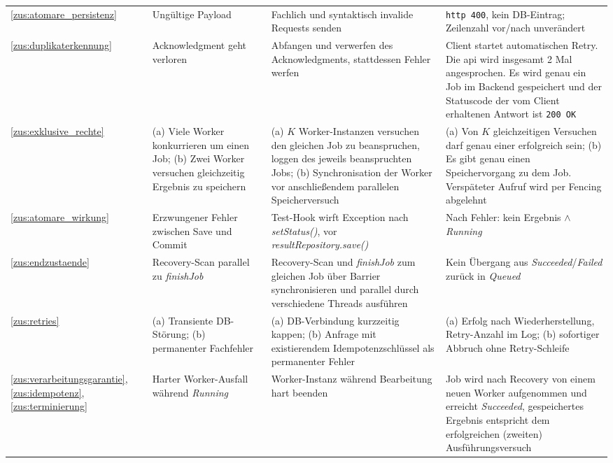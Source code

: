 \begin{longtable}{@{}p{}p{}p{}p{}@{}}
    \ref{zus:atomare_persistenz} & Ungültige Payload & Fachlich und syntaktisch invalide Requests senden & \texttt{\gls{http} 400}, kein DB-Eintrag; Zeilenzahl vor/nach unverändert \\
    \addlinespace
    \ref{zus:duplikaterkennung} & Acknowledgment geht verloren & Abfangen und verwerfen des Acknowledgments, stattdessen Fehler werfen & Client startet automatischen Retry. Die \gls{api} wird insgesamt 2 Mal angesprochen. Es wird genau ein Job im Backend gespeichert und der Statuscode der vom Client erhaltenen Antwort ist \texttt{200 OK} \\
    \addlinespace
    \ref{zus:exklusive_rechte} & (a) Viele Worker konkurrieren um einen Job; (b) Zwei Worker versuchen gleichzeitig Ergebnis zu speichern & (a) $K$ Worker-Instanzen versuchen den gleichen Job zu beanspruchen, loggen des jeweils beanspruchten Jobs; (b) Synchronisation der Worker vor anschließendem parallelen Speicherversuch & (a) Von $K$ gleichzeitigen Versuchen darf genau einer erfolgreich sein; (b) Es gibt genau einen Speichervorgang zu dem Job. Verspäteter Aufruf wird per Fencing abgelehnt \\
    \addlinespace
    \ref{zus:atomare_wirkung} & Erzwungener Fehler zwischen Save und Commit & Test-Hook wirft Exception nach \textit{setStatus()}, vor \mbox{\textit{resultRepository.save()}} & Nach Fehler: kein Ergebnis $\wedge$ \textit{Running} \\
    \addlinespace
    \ref{zus:endzustaende} & Recovery-Scan parallel zu \mbox{\textit{finishJob}} & Recovery-Scan und \textit{finishJob} zum gleichen Job über Barrier synchronisieren und parallel durch verschiedene Threads ausführen & Kein Übergang aus \mbox{\textit{Succeeded}}/\textit{Failed} zurück in \textit{Queued} \\
    \addlinespace
    \ref{zus:retries} & (a) Transiente DB-Störung; (b) permanenter Fachfehler & (a) DB-Verbindung kurzzeitig kappen; (b) Anfrage mit existierendem Idempotenzschlüssel als permanenter Fehler & (a) Erfolg nach Wiederherstellung, Retry-Anzahl im Log; (b) sofortiger Abbruch ohne Retry-Schleife \\
    \addlinespace
    \ref{zus:verarbeitungsgarantie}, \ref{zus:idempotenz}, \ref{zus:terminierung} & Harter Worker-Ausfall während \textit{Running} & Worker-Instanz während Bearbeitung hart beenden & Job wird nach Recovery von einem neuen Worker aufgenommen und erreicht \mbox{\textit{Succeeded}}, gespeichertes Ergebnis entspricht dem erfolgreichen (zweiten) Ausführungsversuch \\

\end{longtable}
